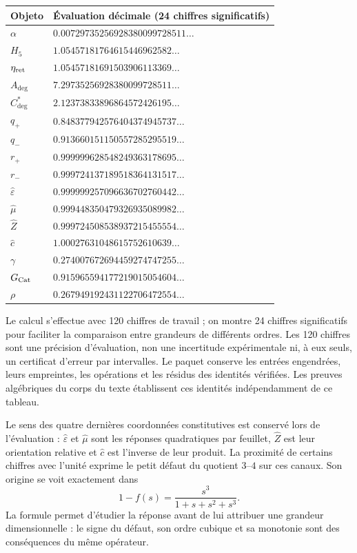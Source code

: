 \begin{longtable}{@{}ll@{}}
\toprule
Objeto & Évaluation décimale (24 chiffres significatifs)\\
\midrule\endhead
$\alpha$ & $0.00729735256928380099728511\ldots$ \\
$H_5$ & $1.05457181764615446962582\ldots$ \\
$\eta_{\rm ret}$ & $1.05457181691503906113369\ldots$ \\
$A_{\deg}$ & $7.29735256928380099728511\ldots$ \\
$C^*_{\deg}$ & $2.12373833896864572426195\ldots$ \\
$q_+$ & $0.848377942576404374945737\ldots$ \\
$q_-$ & $0.913660151150557285295519\ldots$ \\
$r_+$ & $0.999999628548249363178695\ldots$ \\
$r_-$ & $0.999724137189518364131517\ldots$ \\
$\widehat\varepsilon$ & $0.999999257096636702760442\ldots$ \\
$\widehat\mu$ & $0.999448350479326935089982\ldots$ \\
$\widehat Z$ & $0.999724508538937215455554\ldots$ \\
$\widehat c$ & $1.00027631048615752610639\ldots$ \\
$\gamma$ & $0.274007672694459274747255\ldots$ \\
$G_{\rm Cat}$ & $0.915965594177219015054604\ldots$ \\
$\rho$ & $0.267949192431122706472554\ldots$ \\
\bottomrule
\end{longtable}



Le calcul s’effectue avec 120 chiffres de travail ; on montre 24 chiffres
significatifs pour faciliter la comparaison entre grandeurs de différents
ordres. Les 120 chiffres sont une précision d’évaluation, non une incertitude
expérimentale ni, à eux seuls, un certificat d’erreur par intervalles.
Le paquet conserve les entrées engendrées, leurs empreintes, les opérations et
les résidus des identités vérifiées. Les preuves algébriques du
corps du texte établissent ces identités indépendamment de ce tableau.

Le sens des quatre dernières coordonnées constitutives est conservé
lors de l’évaluation : $\widehat\varepsilon$ et $\widehat\mu$ sont les réponses
quadratiques par feuillet, $\widehat Z$ est leur orientation relative et
$\widehat c$ est l’inverse de leur produit. La proximité de certains chiffres avec
l’unité exprime le petit défaut du quotient $3$--$4$ sur ces
canaux. Son origine se voit exactement dans
\[
 1-f(s)=\frac{s^3}{1+s+s^2+s^3}.
\]
La formule permet d’étudier la réponse avant de lui attribuer une grandeur
dimensionnelle : le signe du défaut, son ordre cubique et sa monotonie sont
des conséquences du même opérateur.

